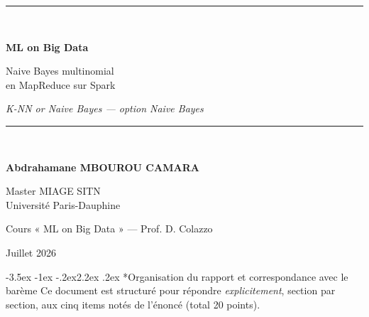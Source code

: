 \documentclass[11pt,a4paper]{article}
\makeatletter
\renewcommand\section{\@startsection{section}{1}{\z@}%
  {-3.5ex \@plus -1ex \@minus -.2ex}{2.2ex \@plus.2ex}%
  {\normalfont\Large\bfseries\color{primary}}}
\makeatother
\begin{document}
\thispagestyle{empty}
\vspace*{2.2cm}
\begin{center}
{\color{primary}\rule{\linewidth}{1.6pt}}\\[0.8cm]
{\Huge\bfseries\color{primary} ML on Big Data\par}
\vspace{0.5cm}
{\LARGE Naive Bayes multinomial\\[0.2em] en MapReduce sur Spark\par}
\vspace{0.5cm}
{\large\itshape K-NN \emph{or} Naive Bayes --- option Naive Bayes\par}
\vspace{0.7cm}
{\color{primary}\rule{\linewidth}{1.6pt}}\\[1.8cm]
{\Large\bfseries Abdrahamane MBOUROU CAMARA\par}
\vspace{0.6cm}
{\large Master MIAGE SITN\\[0.2em] Université Paris-Dauphine\par}
\vspace{0.5cm}
{\large Cours « ML on Big Data » --- Prof. D. Colazzo\par}
\end{center}
\vfill
\begin{center}{\large Juillet 2026}\end{center}
\clearpage

\begingroup
\setlength{\parskip}{0.35em}
\tableofcontents
\endgroup
\clearpage

\section*{Organisation du rapport et correspondance avec le barème}
Ce document est structuré pour répondre \emph{explicitement}, section par section, aux
cinq items notés de l'énoncé (total 20 points).
\end{document}
